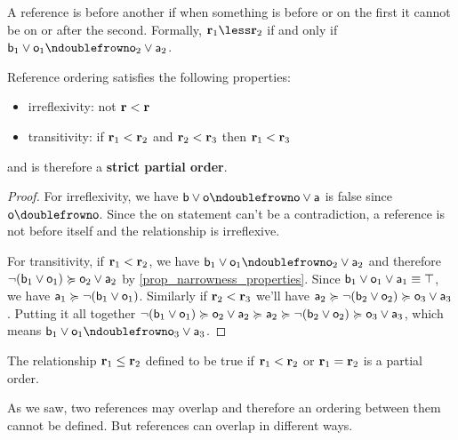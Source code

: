 \documentclass[11pt,letterpaper,fleqn]{memoir} %
\begin{document}
\begin{mathSection}
\begin{defn}
	A reference is before another if when something is before or on the first it cannot be on or after the second. Formally, $\refStmt_1 \less \refStmt_2$ if and only if $\stmt[b]_1 \OR \stmt[o]_1 \ncomp \stmt[o]_2 \OR \stmt[a]_2$.
\end{defn}
\begin{prop}
	Reference ordering satisfies the following properties:
	\begin{itemize}
		\item irreflexivity: not $\refStmt < \refStmt$
		\item transitivity: if $\refStmt_1 < \refStmt_2$ and $\refStmt_2 < \refStmt_3$ then $\refStmt_1 < \refStmt_3$
	\end{itemize}
	and is therefore a \textbf{strict partial order}.
\end{prop}
\begin{proof}
	For irreflexivity, we have $\stmt[b] \OR \stmt[o] \ncomp \stmt[o] \OR \stmt[a]$ is false since $\stmt[o] \comp \stmt[o]$. Since the on statement can't be a contradiction, a reference is not before itself and the relationship is irreflexive.
	
	For transitivity, if $\refStmt_1 < \refStmt_2$, we have $\stmt[b]_1 \OR \stmt[o]_1 \ncomp \stmt[o]_2 \OR \stmt[a]_2$ and therefore $\NOT (\stmt[b]_1 \OR \stmt[o]_1) \broader \stmt[o]_2 \OR \stmt[a]_2$ by \ref{prop_narrowness_properties}. Since $\stmt[b]_1 \OR \stmt[o]_1 \OR \stmt[a]_1 \equiv \tautology$, we have $\stmt[a]_1 \broader \NOT (\stmt[b]_1 \OR \stmt[o]_1)$. Similarly if $\refStmt_2 < \refStmt_3$ we'll have $\stmt[a]_2 \broader \NOT (\stmt[b]_2 \OR \stmt[o]_2) \broader \stmt[o]_3 \OR \stmt[a]_3$. Putting it all together $\NOT (\stmt[b]_1 \OR \stmt[o]_1) \broader \stmt[o]_2 \OR \stmt[a]_2 \broader \stmt[a]_2 \broader \NOT (\stmt[b]_2 \OR \stmt[o]_2) \broader \stmt[o]_3 \OR \stmt[a]_3$, which means $\stmt[b]_1 \OR \stmt[o]_1 \ncomp \stmt[o]_3 \OR \stmt[a]_3$.
\end{proof}
\begin{coro}
	The relationship $\refStmt_1 \leq \refStmt_2$ defined to be true if $\refStmt_1 < \refStmt_2$ or $\refStmt_1 = \refStmt_2$ is a partial order.
\end{coro}
\end{mathSection}

As we saw, two references may overlap and therefore an ordering between them cannot be defined. But references can overlap in different ways.
\end{document}
